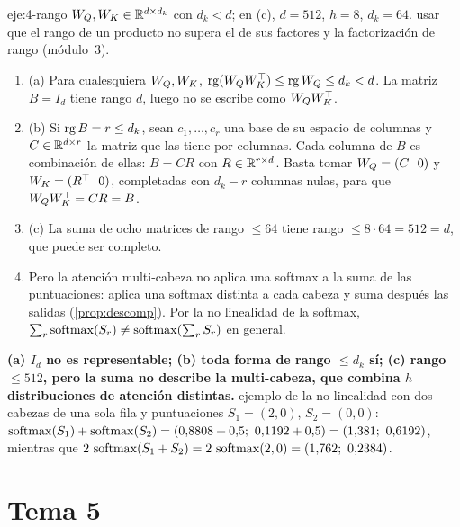 \begin{solucion}{eje:4-rango}
\datos $W_{Q},W_{K}\in\mathbb{R}^{d\times d_k}$ con $d_k<d$; en (c), $d=512$, $h=8$, $d_k=64$.
\planteamiento usar que el rango de un producto no supera el de sus factores y la factorización de rango (módulo~3).
\pasos
\begin{enumerate}[label=\arabic*.]
  \item (a) Para cualesquiera $W_{Q},W_{K}$, $\operatorname{rg}(W_{Q}W_{K}^{\top})\le\operatorname{rg}W_{Q}\le d_k<d$. La matriz $B=I_d$ tiene rango $d$, luego no se escribe como $W_{Q}W_{K}^{\top}$.
  \item (b) Si $\operatorname{rg} B=r\le d_k$, sean $c_1,\dots,c_r$ una base de su espacio de columnas y $C\in\mathbb{R}^{d\times r}$ la matriz que las tiene por columnas. Cada columna de $B$ es combinación de ellas: $B=CR$ con $R\in\mathbb{R}^{r\times d}$. Basta tomar $W_{Q}=(C\ \ 0)$ y $W_{K}=(R^{\top}\ \ 0)$, completadas con $d_k-r$ columnas nulas, para que $W_{Q}W_{K}^{\top}=CR=B$.
  \item (c) La suma de ocho matrices de rango $\le64$ tiene rango $\le8\cdot64=512=d$, que puede ser completo.
  \item Pero la atención multi-cabeza no aplica una softmax a la suma de las puntuaciones: aplica una softmax distinta a cada cabeza y suma después las salidas (\cref{prop:descomp}). Por la no linealidad de la softmax, $\sum_r\operatorname{softmax}(S_r)\ne\operatorname{softmax}(\sum_rS_r)$ en general.
\end{enumerate}
\resultado \textbf{(a) $I_d$ no es representable; (b) toda forma de rango $\le d_k$ sí; (c) rango $\le512$, pero la suma no describe la multi-cabeza, que combina $h$ distribuciones de atención distintas.}
\comprobacion ejemplo de la no linealidad con dos cabezas de una sola fila y puntuaciones $S_1=(2,0)$, $S_2=(0,0)$: $\softmax(S_1)+\softmax(S_2)=(0{,}8808+0{,}5;\allowbreak\ 0{,}1192+0{,}5)=(1{,}381;\allowbreak\ 0{,}6192)$, mientras que $2\,\softmax(S_1+S_2)=2\,\softmax(2,0)=(1{,}762;\allowbreak\ 0{,}2384)$.
\end{solucion}

\section{Tema 5}

